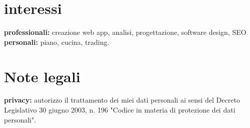 \documentclass[]{friggeri-cv} %
\begin{document}
\section{interessi}
\textbf{professionali:} creazione web app, analisi, progettazione, software design, SEO \textbf{personali:} piano, cucina, trading.

\section{Note legali}
\textbf{privacy:} autorizzo il trattamento dei miei dati personali ai sensi del Decreto
Legislativo 30 giugno 2003, n. 196  "Codice in materia di protezione dei dati
personali".
\end{document}
